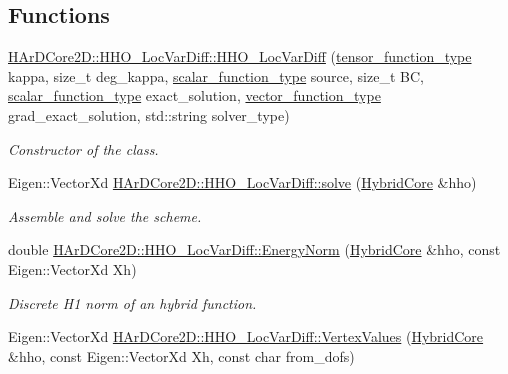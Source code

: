 \subsection*{Functions}
\begin{DoxyCompactItemize}
\item 
\hyperlink{group__HHO__LocVarDiff_ga57daa01081647a684101ea854b4336b4}{H\+Ar\+D\+Core2\+D\+::\+H\+H\+O\+\_\+\+Loc\+Var\+Diff\+::\+H\+H\+O\+\_\+\+Loc\+Var\+Diff} (\hyperlink{classHArDCore2D_1_1HHO__LocVarDiff_a65b5cbf39a759b6ce3b097536f32f5cb}{tensor\+\_\+function\+\_\+type} kappa, size\+\_\+t deg\+\_\+kappa, \hyperlink{classHArDCore2D_1_1HHO__LocVarDiff_a8b00c073fd089f8c5a642f8dab63f2a3}{scalar\+\_\+function\+\_\+type} source, size\+\_\+t BC, \hyperlink{classHArDCore2D_1_1HHO__LocVarDiff_a8b00c073fd089f8c5a642f8dab63f2a3}{scalar\+\_\+function\+\_\+type} exact\+\_\+solution, \hyperlink{classHArDCore2D_1_1HHO__LocVarDiff_a9951a7b7866719b71956c455f1e3d937}{vector\+\_\+function\+\_\+type} grad\+\_\+exact\+\_\+solution, std\+::string solver\+\_\+type)
\begin{DoxyCompactList}\small\item\em Constructor of the class. \end{DoxyCompactList}\item 
\mbox{\label{group__HHO__LocVarDiff_ga74eac0904256440c429fb9502112a867}} 
Eigen\+::\+Vector\+Xd \hyperlink{group__HHO__LocVarDiff_ga74eac0904256440c429fb9502112a867}{H\+Ar\+D\+Core2\+D\+::\+H\+H\+O\+\_\+\+Loc\+Var\+Diff\+::solve} (\hyperlink{classHArDCore2D_1_1HybridCore}{Hybrid\+Core} \&hho)
\begin{DoxyCompactList}\small\item\em Assemble and solve the scheme. \end{DoxyCompactList}\item 
\mbox{\label{group__HHO__LocVarDiff_gaf359d2047dc5b2fb8640a01c025fb860}} 
double \hyperlink{group__HHO__LocVarDiff_gaf359d2047dc5b2fb8640a01c025fb860}{H\+Ar\+D\+Core2\+D\+::\+H\+H\+O\+\_\+\+Loc\+Var\+Diff\+::\+Energy\+Norm} (\hyperlink{classHArDCore2D_1_1HybridCore}{Hybrid\+Core} \&hho, const Eigen\+::\+Vector\+Xd Xh)
\begin{DoxyCompactList}\small\item\em Discrete H1 norm of an hybrid function. \end{DoxyCompactList}\item 
Eigen\+::\+Vector\+Xd \hyperlink{group__HHO__LocVarDiff_gade5fe2edbaf0120b9b5794e96c30e568}{H\+Ar\+D\+Core2\+D\+::\+H\+H\+O\+\_\+\+Loc\+Var\+Diff\+::\+Vertex\+Values} (\hyperlink{classHArDCore2D_1_1HybridCore}{Hybrid\+Core} \&hho, const Eigen\+::\+Vector\+Xd Xh, const char from\+\_\+dofs)

\end{DoxyCompactItemize}
